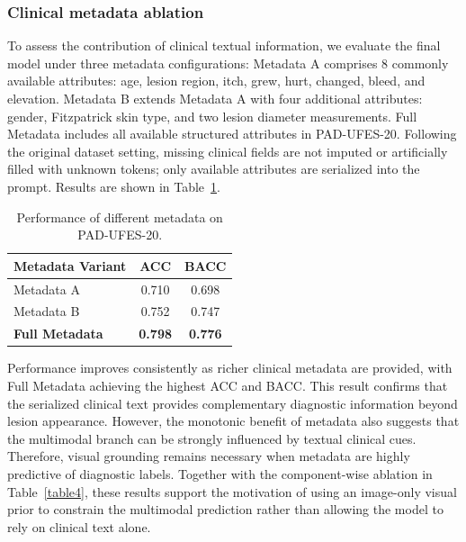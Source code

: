 \documentclass[preprint,12pt]{elsarticle}
\makeatletter
\def@NAT@last@yr{--\NAT@penalty}%
\makeatother
\begin{document}
\subsubsection{Clinical metadata ablation}
To assess the contribution of clinical textual information, we evaluate the final model under three metadata configurations: Metadata A comprises 8 commonly available attributes: age, lesion region, itch, grew, hurt, changed, bleed, and elevation. Metadata B extends Metadata A with four additional attributes: gender, Fitzpatrick skin type, and two lesion diameter measurements. Full Metadata includes all available structured attributes in PAD-UFES-20. Following the original dataset setting, missing clinical fields are not imputed or artificially filled with unknown tokens; only available attributes are serialized into the prompt. Results are shown in Table~\ref{table5}.

\begin{table}[!htbp]
	\centering
	\caption{Performance of different metadata on PAD-UFES-20.}
	\label{table5}
	\setlength{\tabcolsep}{15pt}
	\begin{tabular}{lcc}
		\toprule
		\textbf{Metadata Variant} & \textbf{ACC} & \textbf{BACC} \\
		\midrule
		Metadata A           & 0.710  & 0.698  \\
		Metadata B        & 0.752  & 0.747  \\
		\textbf{Full Metadata}             & \textbf{0.798} & \textbf{0.776 } \\
		\bottomrule
	\end{tabular}
\end{table}


Performance improves consistently as richer clinical metadata are provided, with Full Metadata achieving the highest ACC and BACC. This result confirms that the serialized clinical text provides complementary diagnostic information beyond lesion appearance. However, the monotonic benefit of metadata also suggests that the multimodal branch can be strongly influenced by textual clinical cues. Therefore, visual grounding remains necessary when metadata are highly predictive of diagnostic labels. Together with the component-wise ablation in Table~\ref{table4}, these results support the motivation of using an image-only visual prior to constrain the multimodal prediction rather than allowing the model to rely on clinical text alone.
\end{document}
